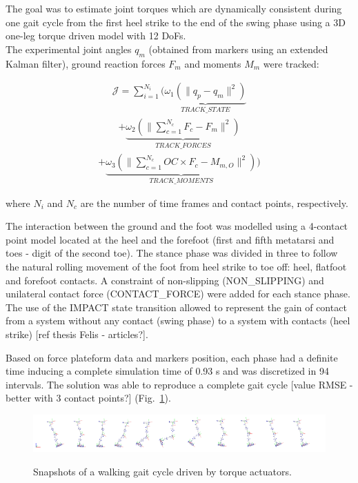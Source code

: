 The goal was to estimate joint torques which are dynamically consistent during one gait cycle from the first heel strike to the end of the swing phase using a 3D one-leg torque driven model with 12 DoFs.  \\

The experimental joint angles $q_m$ (obtained from markers using an extended Kalman filter), ground reaction forces $F_m$ and moments $M_m$ were tracked:

\begin{eqnarray}
\label{eq:ocp_q}
\mathcal{J} = \sum_{i=1}^{N_i}\Bigg(\underbrace{\omega_1(\|q_p - q_m\|^{2})}_{TRACK\_STATE}
\label{eq:ocp_forces}
\end{eqnarray}
\begin{eqnarray}
+ \underbrace{\omega_2(\|\sum_{c=1}^{N_c}F_c - F_m\|^{2})}_{TRACK\_FORCES}
\end{eqnarray}
\begin{eqnarray}
\label{eq:ocp_moments}
+ \underbrace{\omega_3(\|\sum_{c=1}^{N_c}OC\times F_c - M_{m,O}\|^{2})}_{TRACK\_MOMENTS}\bigg) 
\end{eqnarray}

where $N_i$ and $N_c$ are the number of time frames and contact points, respectively. 

The interaction between the ground and the foot was modelled using a 4-contact point model located at the heel and the forefoot (first and fifth metatarsi and toes - digit of the second toe). The stance phase was divided in three to follow the natural rolling movement of the foot from heel strike to toe off: heel, flatfoot and forefoot contacts. A constraint of non-slipping (NON\_SLIPPING) and unilateral contact force (CONTACT\_FORCE) were added for each stance phase. The use of the IMPACT state transition allowed to represent the gain of contact from a system without any contact (swing phase) to a system with contacts (heel strike) [ref thesis Felis - articles?].  


Based on force plateform data and markers position, each phase had a definite time inducing a complete simulation time of 0.93 s and was discretized in 94 intervals. The solution was able to reproduce a complete gait cycle [value RMSE - better with 3 contact points?] (Fig.~\ref{fig:snapshots_multiphase_walking_cycle}). 

\begin{figure}[t!]
\centering
\includegraphics[width=\textwidth]{figures/multiphase_walking_cycle.png}\\
\caption{Snapshots of a walking gait cycle driven by torque actuators.}
\label{fig:snapshots_multiphase_walking_cycle}
\end{figure}

